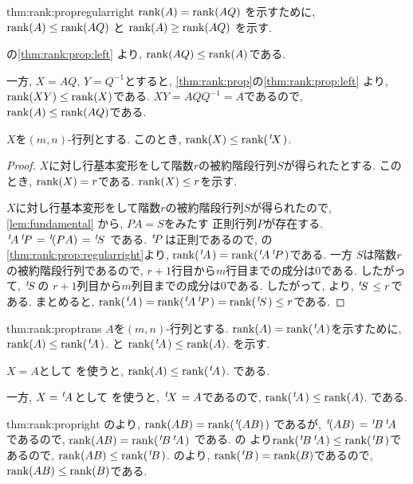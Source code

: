 \begin{proofof*}{thm:rank:prop}{regularright}
   $\operatorname{rank}(A)=\operatorname{rank}(AQ)$
  を示すために,
   $\operatorname{rank}(A)\leq\operatorname{rank}(AQ)$
  と
   $\operatorname{rank}(A)\geq\operatorname{rank}(AQ)$
  を示す.
  
  の\cref{thm:rank:prop:left}
  より, $\operatorname{rank}(AQ)\leq \operatorname{rank}(A)$である.
  
  一方, 
  $X=AQ$, $Y=Q^{-1}$とすると,
  \cref{thm:rank:prop}の\cref{thm:rank:prop:left}
  より, $\operatorname{rank}(XY)\leq \operatorname{rank}(X)$である.
  $XY=AQQ^{-1}=A$であるので,
  $\operatorname{rank}(A)\leq\operatorname{rank}(AQ)$である.
\end{proofof*}

\begin{lemma}
  \label{lem:ineq:transrank}
  $X$を$(m,n)$-行列とする.
  このとき, $\operatorname{rank}(X)\leq \operatorname{rank}({\left.^{t}\!X\right.})$.
\end{lemma}
\begin{proof}
  $X$に対し行基本変形をして階数$r$の被約階段行列$S$が得られたとする.
  このとき, $\operatorname{rank}(X)=r$である.
  $\operatorname{rank}(X)\leq r$を示す.

  $X$に対し行基本変形をして階数$r$の被約階段行列$S$が得られたので,
  \cref{lem:fundamental}
  から,
  $PA=S$をみたす
  正則行列$P$が存在する.
  ${\left.^{t}\!A\right.}{\left.^{t}\!P\right.}={\left.^{t}\!(PA)\right.}={\left.^{t}\!S\right.}$
  である.
  ${\left.^{t}\!P\right.}$は正則であるので,
  の\cref{thm:rank:prop:regularright}より,
  $\operatorname{rank}({\left.^{t}\!A\right.})=\operatorname{rank}({\left.^{t}\!A\right.}{\left.^{t}\!P\right.})$である.
  一方
  $S$は階数$r$の被約階段行列であるので,
  $r+1$行目から$m$行目までの成分は$0$である.
  したがって,
  ${\left.^{t}\!S\right.}$の
  $r+1$列目から$m$列目までの成分は$0$である.
  したがって,
  より,
  ${\left.^{t}\!S\right.}\leq r$である.
  まとめると,
  $\operatorname{rank}({\left.^{t}\!A\right.})=\operatorname{rank}({\left.^{t}\!A\right.}{\left.^{t}\!P\right.})=\operatorname{rank}({\left.^{t}\!S\right.})\leq r$である.
\end{proof}
\begin{proofof*}{thm:rank:prop}{trans}
  $A$を$(m,n)$-行列とする.
  $\operatorname{rank}(A)=\operatorname{rank}({\left.^{t}\!A\right.})$を示すために,
  $\operatorname{rank}(A)\leq\operatorname{rank}({\left.^{t}\!A\right.})$.
  と
  $\operatorname{rank}({\left.^{t}\!A\right.})\leq \operatorname{rank}(A)$.
  を示す.
  
  $X=A$として
  を使うと,
  $\operatorname{rank}(A)\leq\operatorname{rank}({\left.^{t}\!A\right.})$.
  である.

  一方,
  $X={\left.^{t}\!A\right.}$として
  を使うと,
  ${\left.^{t}\!X\right.}=A$であるので,
  $\operatorname{rank}({\left.^{t}\!A\right.})\leq \operatorname{rank}(A)$.
  である.
  
\end{proofof*}
\begin{proofof*}{thm:rank:prop}{right}
  のより,
  $\operatorname{rank}(AB)=\operatorname{rank}({\left.^{t}\!(AB)\right.})$
  であるが, ${\left.^{t}\!(AB)\right.}={\left.^{t}\!B\right.}{\left.^{t}\!A\right.}$であるので,
  $\operatorname{rank}(AB)=\operatorname{rank}({\left.^{t}\!B\right.}{\left.^{t}\!A\right.})$
  である.
  の
  より$\operatorname{rank}({\left.^{t}\!B\right.}{\left.^{t}\!A\right.})\leq\operatorname{rank}({\left.^{t}\!B\right.})$であるので,
  $\operatorname{rank}(AB)\leq\operatorname{rank}({\left.^{t}\!B\right.})$.
  のより,
  $\operatorname{rank}({\left.^{t}\!B\right.})=\operatorname{rank}(B)$であるので,
  $\operatorname{rank}(AB)\leq \operatorname{rank}(B)$である.
\end{proofof*}

